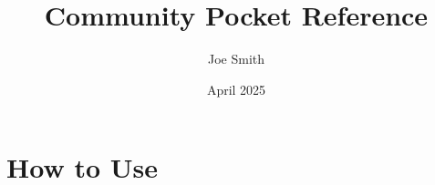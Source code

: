 \documentclass{book}
\title{Community Pocket Reference}
\author{Joe Smith}
\date{April 2025}
\begin{document}
\maketitle

\section{How to Use}







\end{document}
